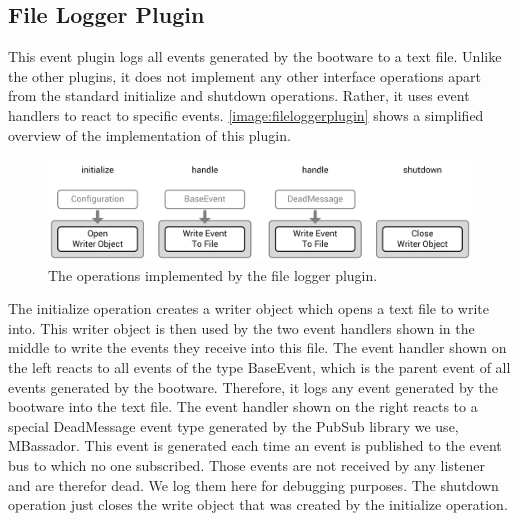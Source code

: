\subsection{File Logger Plugin}

This event plugin logs all events generated by the bootware to a text file.
Unlike the other plugins, it does not implement any other interface operations apart from the standard initialize and shutdown operations.
Rather, it uses event handlers to react to specific events.
\autoref{image:fileloggerplugin} shows a simplified overview of the implementation of this plugin.

\begin{figure}[!htbp]
	\centering
	\includegraphics[resolution=600]{implementation/assets/filelogger_plugin}
	\caption{The operations implemented by the file logger plugin.}
	\label{image:fileloggerplugin}
\end{figure}

The initialize operation creates a writer object which opens a text file to write into.
This writer object is then used by the two event handlers shown in the middle to write the events they receive into this file.
The event handler shown on the left reacts to all events of the type BaseEvent, which is the parent event of all events generated by the bootware.
Therefore, it logs any event generated by the bootware into the text file.
The event handler shown on the right reacts to a special DeadMessage event type generated by the PubSub library we use, MBassador.
This event is generated each time an event is published to the event bus to which no one subscribed.
Those events are not received by any listener and are therefor dead.
We log them here for debugging purposes.
The shutdown operation just closes the write object that was created by the initialize operation.
